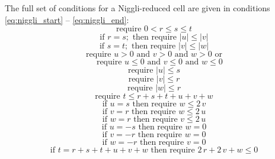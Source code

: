 \documentclass[preprint]{iucr}              %
\begin{document}
The full set of conditions for a Niggli-reduced cell are
given in conditions \ref{eq:niggli_start} -- \ref{eq:niggli_end}:
\begin{equation}
\text{require } 0 < r \leq s \leq t \label{eq:niggli_start}
\end{equation}
\begin{equation}
\text{if } r = s; \text{ then require } |u| \leq |v|
\end{equation}
\begin{equation}
\text{if } s = t; \text{ then require } |v| \leq |w| 
\end{equation}
\begin{equation}
\text{require } u > 0 \text{ and } v > 0 \text{ and } w > 0 \text{ or}
\end{equation}
\begin{equation}
\text{~~~~require } u \leq 0 \text{ and } v \leq 0 \text{ and } w \leq 0 
\end{equation}
\begin{equation}
\text{require } |u| \leq s
\end{equation}
\begin{equation}
\text{require } |v| \leq r
\end{equation}
\begin{equation}
\text{require } |w| \leq r
\end{equation}
\begin{equation}
\text{require } t \leq r + s + t + u + v + w 
\end{equation}
\begin{equation}
\text{if } u = s \text{ then require }  w \leq 2\,v
\end{equation}
\begin{equation}
\text{if } v = r \text{ then require }  w \leq 2\,u
\end{equation}
\begin{equation}
\text{if } w = r \text{ then require }  v \leq 2\,u
\end{equation}
\begin{equation}
\text{if } u = -s \text{ then require }  w = 0
\end{equation}
\begin{equation}
\text{if } v = -r \text{ then require }  w = 0
\end{equation}
\begin{equation}
\text{if } w = -r \text{ then require }  v = 0
\end{equation}
\begin{equation}
\text{if } t = r + s + t + u + v + w 
\text{ then require } 2\,r + 2\, v + w \leq 0 \label{eq:niggli_end}
\end{equation}
\end{document}
